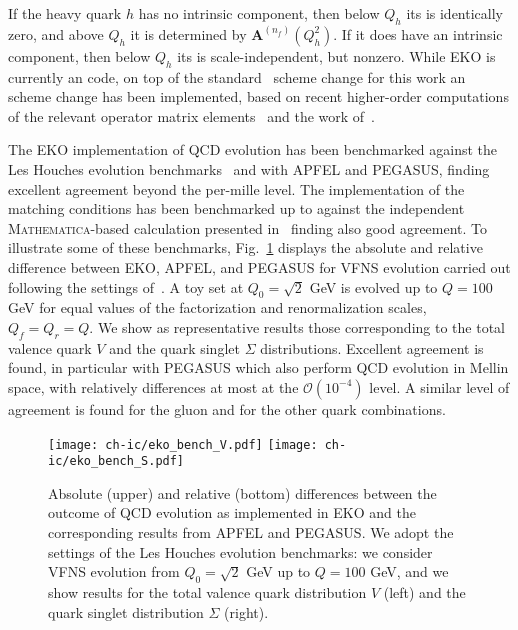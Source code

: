 If the heavy quark $h$ has no intrinsic component, then below $Q_h$
its \pdf is identically zero, and above $Q_h$ it is determined by
$\mathbf{A}^{(n_f)}(Q_{h}^2)$. If it does have an intrinsic
component, then  below $Q_h$ its \pdf is scale-independent, but nonzero.
While  \textsc{\small EKO} is currently an \nnlo code, on
top of the standard~\cite{pdfnnlo} \nnlo scheme change for this work
an \nnnlo scheme change has been implemented, based on recent higher-order computations
of the relevant operator matrix elements~\cite{Bierenbaum:2009zt,Bierenbaum:2009mv,Ablinger:2010ty,Ablinger:2014vwa,Ablinger:2014uka,Behring:2014eya,Blumlein:2017wxd,Ablinger_2014,Ablinger:2014nga}
and the work of~\cite{zanoli}.

The  \textsc{\small EKO} implementation of QCD evolution has been
benchmarked against the Les Houches \pdf evolution
benchmarks~\cite{Dittmar:2005ed,Giele:2002hx} and with
\textsc{\small APFEL} and \textsc{\small PEGASUS},
finding excellent agreement beyond the per-mille level.
%
The implementation of the  matching conditions
has been benchmarked up to \nnnlo against the independent \textsc{\small Mathematica}-based calculation 
presented in~\cite{zanoli} finding also good agreement.
%
To illustrate some of these benchmarks, Fig.~\ref{fig:ic/EKObench} displays
the absolute and relative difference between \textsc{\small EKO},
\textsc{\small APFEL}, and \textsc{\small PEGASUS}
for \nnlo VFNS evolution
carried out
following the settings of~\cite{Dittmar:2005ed,Giele:2002hx}.
%
A toy \pdf set at $Q_0=\sqrt{2}$ GeV is evolved up to $Q=100$ GeV
for equal values of the factorization and renormalization scales, $Q_f=Q_r=Q$.
%
We show as representative results those corresponding to
the  total valence quark  $V$ 
and the quark singlet $\Sigma$ distributions.
%
Excellent agreement is found, in particular
with \textsc{\small PEGASUS} which also perform QCD
evolution in Mellin space, with relatively differences
at most at the $\mathcal{O}\left( 10^{-4}\right)$ level.
%
A similar level of agreement is found
for the gluon and for the other quark \pdf combinations.

\begin{figure}[t]
    \begin{center}
        \texttt{[image: ch-ic/eko\_bench\_V.pdf]}
        \texttt{[image: ch-ic/eko\_bench\_S.pdf]}
        \caption{\small Absolute (upper) and relative (bottom) differences between 
        the outcome of \nnlo QCD evolution
        as implemented in
        \textsc{\small EKO} and the
        corresponding results from \textsc{\small APFEL} and \textsc{\small PEGASUS}.
We adopt the settings of the Les Houches \pdf evolution benchmarks: we
consider  VFNS evolution from $Q_0=\sqrt{2}$ GeV up to $Q=100$ GeV,
and we show  results for the total valence quark distribution $V$ (left)
and the quark singlet distribution $\Sigma$ (right).
      \label{fig:ic/EKObench} }
    \end{center}
\end{figure}
